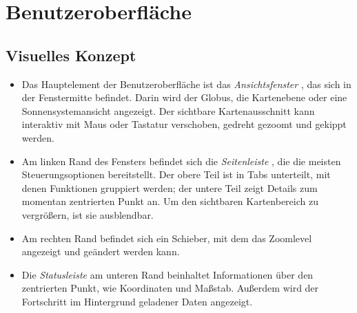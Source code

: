 \documentclass[10pt]{scrreprt}
\begin{document}
\chapter{Benutzeroberfläche}

\section{Visuelles Konzept}

\begin{itemize}
	\item Das Hauptelement der Benutzeroberfläche ist das \textit{Ansichtsfenster} , das sich in der Fenstermitte befindet. Darin wird der Globus, die Kartenebene oder eine Sonnensystemansicht angezeigt. Der sichtbare Kartenausschnitt kann interaktiv mit Maus oder Tastatur verschoben, gedreht gezoomt und gekippt werden.
	\item Am linken Rand des Fensters befindet sich die \textit{Seitenleiste} , die die meisten Steuerungsoptionen bereitstellt. Der obere Teil ist in Tabs unterteilt, mit denen Funktionen gruppiert werden; der untere Teil zeigt Details zum momentan zentrierten Punkt an. Um den sichtbaren Kartenbereich zu vergrößern, ist sie ausblendbar.
	\item Am rechten Rand  befindet sich ein Schieber, mit dem das Zoomlevel angezeigt und geändert werden kann.
	\item Die \textit{Statusleiste}  am unteren Rand beinhaltet Informationen über den zentrierten Punkt, wie Koordinaten und Maßstab. Außerdem wird der Fortschritt im Hintergrund geladener Daten angezeigt.
\end{itemize}
\end{document}

